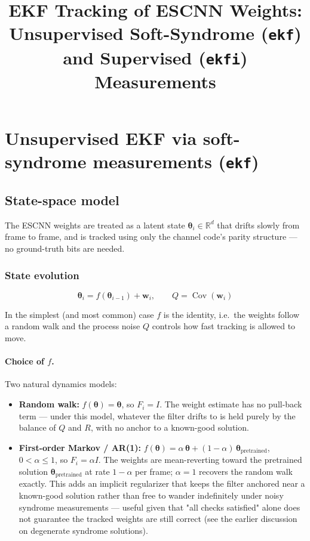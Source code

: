 \documentclass{article}
\title{EKF Tracking of ESCNN Weights:\\Unsupervised Soft-Syndrome (\texttt{ekf}) and Supervised (\texttt{ekfi}) Measurements}
\author{}
\date{}
\newcommand{\state}{\boldsymbol{\theta}}
\begin{document}
\maketitle

\section{Unsupervised EKF via soft-syndrome measurements (\texttt{ekf})}
\label{sec:ekf}

\subsection{State-space model}
\label{sec:model}

The ESCNN weights are treated as a latent state $\state_i \in \mathbb{R}^d$ that drifts slowly
from frame to frame, and is tracked using only the channel code's parity structure —
no ground-truth bits are needed.

\subsubsection*{State evolution}

\begin{equation}
\state_i = f(\state_{i-1}) + \mathbf{w}_i, \qquad Q = \operatorname{Cov}(\mathbf{w}_i)
\end{equation}

In the simplest (and most common) case $f$ is the identity, i.e.\ the weights follow a random
walk and the process noise $Q$ controls how fast tracking is allowed to move.

\paragraph{Choice of $f$.} Two natural dynamics models:

\begin{itemize}[itemsep=2pt]
  \item \textbf{Random walk:} $f(\state) = \state$, so $F_i = I$. The weight estimate has no
  pull-back term — under this model, whatever the filter drifts to is held purely by the
  balance of $Q$ and $R$, with no anchor to a known-good solution.
  \item \textbf{First-order Markov / AR(1):}
  $f(\state) = \alpha\,\state + (1-\alpha)\,\state_{\text{pretrained}}$, $0 < \alpha \le 1$,
  so $F_i = \alpha I$. The weights are mean-reverting toward the pretrained solution
  $\state_{\text{pretrained}}$ at rate $1-\alpha$ per frame; $\alpha=1$ recovers the random
  walk exactly. This adds an implicit regularizer that keeps the filter anchored near a
  known-good solution rather than free to wander indefinitely under noisy syndrome
  measurements — useful given that "all checks satisfied" alone does not guarantee the tracked
  weights are still correct (see the earlier discussion on degenerate syndrome solutions).
\end{itemize}
\end{document}
